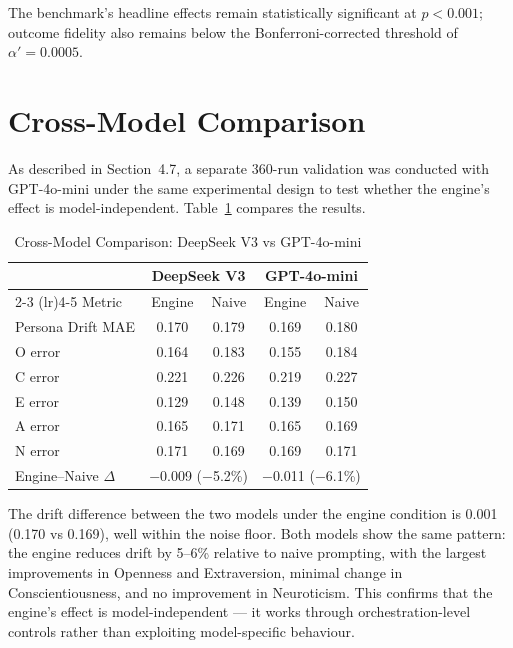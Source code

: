 \documentclass[12pt, a4paper]{report}
\begin{document}
The benchmark's headline effects remain statistically significant at $p < 0.001$; outcome fidelity also remains below the Bonferroni-corrected threshold of $\alpha' = 0.0005$.


\section{Cross-Model Comparison}

As described in Section~4.7, a separate 360-run validation was conducted with GPT-4o-mini under the same experimental design to test whether the engine's effect is model-independent. Table~\ref{tab:crossmodel} compares the results.

\begin{table}[H]
\centering
\caption{Cross-Model Comparison: DeepSeek V3 vs GPT-4o-mini}
\label{tab:crossmodel}
\begin{tabular}{lcccc}
\toprule
 & \multicolumn{2}{c}{DeepSeek V3} & \multicolumn{2}{c}{GPT-4o-mini} \\
\cmidrule(lr){2-3} \cmidrule(lr){4-5}
Metric & Engine & Naive & Engine & Naive \\
\midrule
Persona Drift MAE & \cellcolor{better} 0.170 & 0.179 & \cellcolor{better} 0.169 & 0.180 \\
\quad O error & \cellcolor{better} 0.164 & 0.183 & \cellcolor{better} 0.155 & 0.184 \\
\quad C error & \cellcolor{better} 0.221 & 0.226 & \cellcolor{better} 0.219 & 0.227 \\
\quad E error & \cellcolor{better} 0.129 & 0.148 & \cellcolor{better} 0.139 & 0.150 \\
\quad A error & \cellcolor{better} 0.165 & 0.171 & \cellcolor{better} 0.165 & 0.169 \\
\quad N error & 0.171 & \cellcolor{better} 0.169 & \cellcolor{better} 0.169 & 0.171 \\
\midrule
Engine--Naive $\Delta$ & \multicolumn{2}{c}{$-$0.009 ($-$5.2\%)} & \multicolumn{2}{c}{$-$0.011 ($-$6.1\%)} \\
\bottomrule
\end{tabular}
\end{table}

The drift difference between the two models under the engine condition is 0.001 (0.170 vs 0.169), well within the noise floor. Both models show the same pattern: the engine reduces drift by 5--6\% relative to naive prompting, with the largest improvements in Openness and Extraversion, minimal change in Conscientiousness, and no improvement in Neuroticism. This confirms that the engine's effect is model-independent --- it works through orchestration-level controls rather than exploiting model-specific behaviour.
\end{document}

